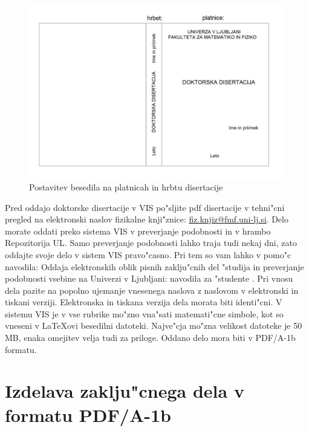 \begin{figure}[h]
\begin{center}
\includegraphics[width=15cm]{Platnicedoktorat}
\end{center}
\caption[Platnice]{Postavitev besedila na platnicah in hrbtu disertacije}
\label{pic2}
\end{figure}

Pred oddajo doktorske disertacije v VIS po"sljite pdf disertacije v tehni"cni pregled na elektronski naslov fizikalne knji"znice: \href{mailto:fiz.knjiz@fmf.uni-lj.si}{fiz.knjiz@fmf.uni-lj.si}.
Delo morate oddati preko sistema \acs{VIS} v preverjanje podobnosti in v hrambo Repozitorija \acs{UL}. 
Samo preverjanje podobnosti lahko traja tudi nekaj dni, zato oddajte svoje delo v sistem \acs{VIS} pravo"casno. 
Pri tem so vam lahko v pomo"c navodila: Oddaja elektronskih oblik pisnih zaklju"cnih del "studija in preverjanje podobnosti vsebine na Univerzi v Ljubljani: navodila za "studente \cite{Oddaja}.
Pri vnosu dela pazite na popolno ujemanje vnesenega naslova z naslovom v elektronski in tiskani verziji. 
Elektronska in tiskana verzija dela morata biti identi"cni. 
V sistemu \acs{VIS} je v vse rubrike mo"zno vna"sati matemati"cne simbole, kot so vneseni v \LaTeX{ovi} besedilni datoteki. 
Najve"cja mo"zna velikost datoteke je 50 MB, enaka omejitev velja tudi za priloge. Oddano delo mora biti v PDF/A-1b formatu. 

\section{Izdelava zaklju"cnega dela v formatu PDF/A-1b}



